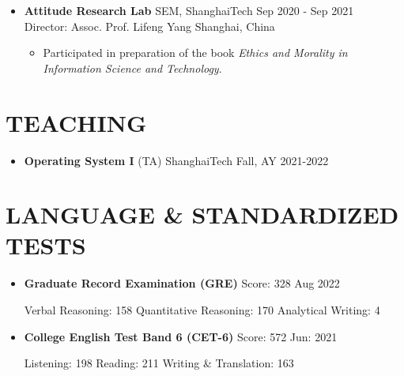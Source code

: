 \documentclass[a4paper,10pt]{ctexart} %
\begin{document}
    \begin{itemize}
        \item \textbf{Attitude Research Lab} \quad SEM, ShanghaiTech \hfill Sep 2020 - Sep 2021 \\
        {\small Director: Assoc. Prof. Lifeng Yang} \hfill Shanghai, China
        \begin{small}
            \begin{itemize}
                \item Participated in preparation of the book \textit{Ethics and Morality in Information Science and Technology}.
            \end{itemize}
        \end{small}
    \end{itemize}



\section{TEACHING}

    \begin{itemize}
        \item \textbf{Operating System I} (TA) \hfill ShanghaiTech \quad Fall, AY 2021-2022
    \end{itemize}



\section{LANGUAGE \& STANDARDIZED TESTS}

    \begin{itemize}
        \item \textbf{Graduate Record Examination (GRE)} \quad Score: 328 \hfill Aug 2022 \\
        \begin{small}
            Verbal Reasoning: 158 \quad Quantitative Reasoning: 170 \quad Analytical Writing: 4
        \end{small}
        \item \textbf{College English Test Band 6 (CET-6)} \quad Score: 572 \hfill Jun: 2021 \\
        \begin{small}
            Listening: 198 \quad Reading: 211 \quad Writing \& Translation: 163
        \end{small}
    \end{itemize}
\end{document}
